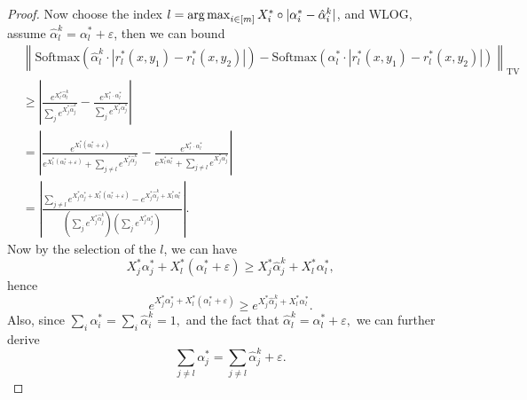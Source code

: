 \begin{proof}
    Now 
    choose the index $l = \operatorname*{arg\,max}_{i \in [m]} X_i^* \circ |\alpha_{i}^* - \hat{\alpha}_i^k|$, and WLOG, assume $\hat{\alpha}_{l}^k = \alpha_{l}^* + \varepsilon$,
    then 
    we can bound 
    \begin{align*}
        &\left\|\textrm{Softmax}(\hat{\alpha}_{l}^k \cdot |r_{l}^*(x,y_1)-r_{l}^*(x,y_2)|)-\textrm{Softmax}(\alpha_{l}^*\cdot |r_{l}^*(x,y_1)-r_{l}^*(x,y_2)|)\right\|_{\mathrm{TV}}\\
        &\ge \left|\frac{e^{X_{l}^*\hat{\alpha}_l^k}}{\sum_j e^{X_j^*\hat{\alpha}_j^k}} - \frac{e^{X_l^*\cdot \alpha_l^*}}{\sum_j e^{X_j^*\alpha_j^*}}\right|\\
        &= \left|\frac{e^{X_l^*(\alpha_l^* + \varepsilon)}}{e^{X_l^*(\alpha_l^* + \varepsilon)}+\sum_{j\neq l} e^{X_j^*\hat{\alpha}_j^k}} - \frac{e^{X_l^*\cdot \alpha_l^*}}{e^{X_l^* \alpha_l^*}+\sum_{j\neq l} e^{X_j^*\alpha_j^*}}\right|\\
        &=\left|\frac{\sum_{j\neq l}e^{X_j^* \alpha_j^* + X_l^*(\alpha_l^* + \varepsilon)}-e^{X_j^* \hat{\alpha}_j^k + X_l^* \alpha_l^*}}{(\sum_j e^{X_j^*\hat{\alpha}_j^k})(\sum_j e^{X_j^*\alpha_j^*})}\right|.
    \end{align*}
    Now by the selection of the $l$, we can have 
    $$X_j^* \alpha_j^* + X_l^*(\alpha_l^* + \varepsilon) \ge X_j^* \hat{\alpha}_j^k + X_l^* \alpha_l^*,$$
    hence 
    $$e^{X_j^* \alpha_j^* + X_l^*(\alpha_l^* + \varepsilon)}\ge e^{X_j^* \hat{\alpha}_j^k + X_l^* \alpha_l^*}.$$
    Also, since $\sum_i\alpha_i^* = \sum_i \hat{\alpha}_i^k = 1,$ and the fact that $\hat{\alpha}_l^k = \alpha_l^* + \varepsilon,$ we can further derive 
    $$\sum_{j\neq l} \alpha_j^* = \sum_{j\neq l} \hat{\alpha}_j^k + \varepsilon.$$


\end{proof}
